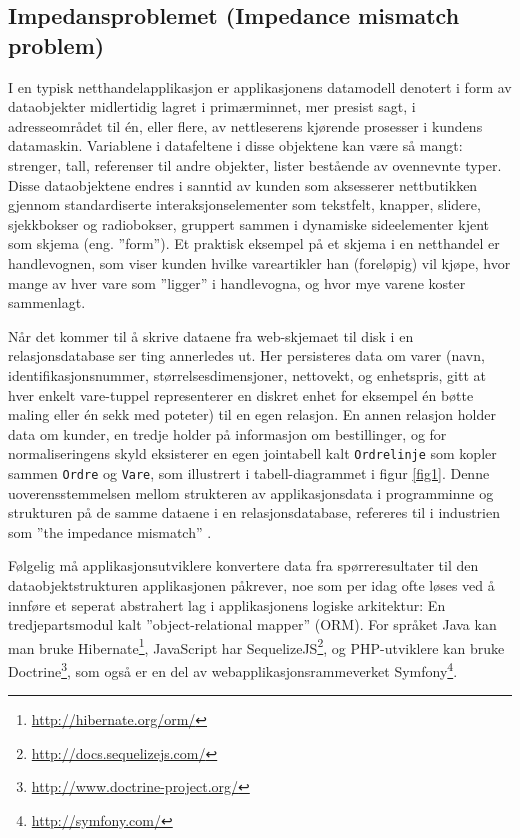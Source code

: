 \subsection{Impedansproblemet (Impedance mismatch problem)}

I en typisk netthandelapplikasjon er applikasjonens datamodell denotert i form av dataobjekter midlertidig lagret i primærminnet, mer presist sagt, i adresseområdet til én, eller flere, av nettleserens kjørende prosesser i kundens datamaskin. Variablene i datafeltene i disse objektene kan være så mangt: strenger, tall, referenser til andre objekter, lister bestående av ovennevnte typer. Disse dataobjektene endres i sanntid av kunden som aksesserer nettbutikken gjennom standardiserte interaksjonselementer som tekstfelt, knapper, slidere, sjekkbokser og radiobokser, gruppert sammen i dynamiske sideelementer kjent som skjema (eng. ''form''). Et praktisk eksempel på et skjema i en netthandel er handlevognen, som viser kunden hvilke vareartikler han (foreløpig) vil kjøpe, hvor mange av hver vare som ''ligger'' i handlevogna, og hvor mye varene koster sammenlagt.

Når det kommer til å skrive dataene fra web-skjemaet til disk i en relasjonsdatabase ser ting annerledes ut. Her persisteres data om varer (navn, identifikasjonsnummer, størrelses\-dimensjoner, nettovekt, og enhetspris, gitt at hver enkelt vare-tuppel representerer en diskret enhet for eksempel én bøtte maling eller én sekk med poteter) til en egen relasjon. En annen relasjon holder data om kunder, en tredje holder på informasjon om bestillinger, og for normaliseringens skyld eksisterer en egen jointabell kalt \texttt{Ordrelinje} som kopler sammen \texttt{Ordre} og \texttt{Vare}, som illustrert i tabell-diagrammet i figur \ref{fig1}. Denne uoverensstemmelsen mellom strukteren av applikasjonsdata i programminne og strukturen på de samme dataene i en relasjonsdatabase, refereres til i industrien som ''the impedance mismatch'' \citep{sadalage2013}.

Følgelig må applikasjonsutviklere konvertere data fra spørreresultater til den dataobjektstrukturen applikasjonen påkrever, noe som per idag ofte løses ved å innføre et seperat abstrahert lag i applikasjonens logiske arkitektur: En tredjepartsmodul kalt ''object-relational mapper'' (ORM). For språket Java kan man bruke Hibernate\footnote{\url{http://hibernate.org/orm/}}, JavaScript har SequelizeJS\footnote{\url{http://docs.sequelizejs.com/}}, og PHP-utviklere kan bruke Doctrine\footnote{\url{http://www.doctrine-project.org/}}, som også er en del av webapplikasjonsrammeverket Symfony\footnote{\url{http://symfony.com/}}.

